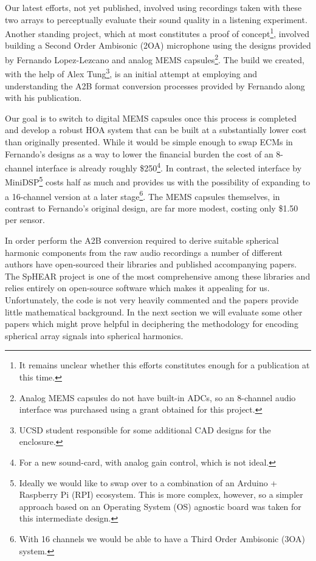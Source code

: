 Our latest efforts, not yet published, involved using recordings taken with these two arrays to perceptually evaluate their sound quality in a listening experiment. Another standing project, which at most constitutes a proof of concept\footnote{It remains unclear whether this efforts constitutes enough for a publication at this time.}, involved building a Second Order Ambisonic (2OA) microphone using the designs provided by Fernando Lopez-Lezcano \cite{lopez2019sphear} and analog MEMS capsules\footnote{Analog MEMS capsules do not have built-in ADCs, so an 8-channel audio interface was purchased using a grant obtained for this project.}. The build we created, with the help of Alex Tung\footnote{UCSD student responsible for some additional CAD designs for the enclosure.}, is an initial attempt at employing and understanding the A2B format conversion processes provided by Fernando along with his publication. 

Our goal is to switch to digital MEMS capsules once this process is completed and develop a robust HOA system that can be built at a substantially lower cost than originally presented. While it would be simple enough to swap ECMs in Fernando's designs as a way to lower the financial burden the cost of an 8-channel interface is already roughly \$250\footnote{For a new sound-card, with analog gain control, which is not ideal.}. In contrast, the selected interface by MiniDSP\footnote{Ideally we would like to swap over to a combination of an Arduino + Raspberry Pi (RPI) ecosystem. This is more complex, however, so a simpler approach based on an Operating System (OS) agnostic board was taken for this intermediate design.} costs half as much and provides us with the possibility of expanding to a 16-channel version at a later stage\footnote{With 16 channels we would be able to have a Third Order Ambisonic (3OA) system.}. The MEMS capsules themselves, in contrast to Fernando's original design, are far more modest, costing only \$1.50 per sensor. 

In order perform the A2B conversion required to derive suitable spherical harmonic components from the raw audio recordings a number of different authors have open-sourced their libraries and published accompanying papers. The SpHEAR \cite{lopez2019sphear} project is one of the most comprehensive among these libraries and relies entirely on open-source software which makes it appealing for us. Unfortunately, the code is not very heavily commented and the papers provide little mathematical background. In the next section we will evaluate some other papers which might prove helpful in deciphering the methodology for encoding spherical array signals into spherical harmonics.

